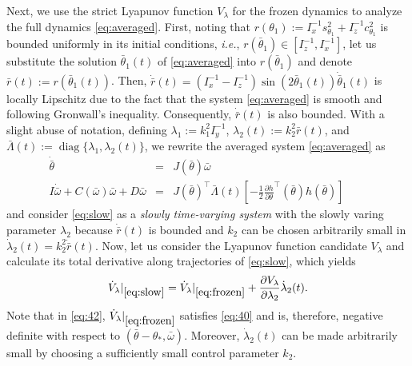 \documentclass{ifacconf}
\begin{document}
Next, we use the strict Lyapunov function $V_\lambda$ for the frozen dynamics to analyze the full dynamics \eqref{eq:averaged}. First, noting that $r(\theta_1):=I_x^{-1}s_{\theta_1}^2+I_z^{-1}c_{\theta_1}^2$ is bounded uniformly in its initial conditions, \textit{i.e.}, $r(\bar{\theta}_1)\in[I_z^{-1}, I_x^{-1}]$, let us substitute the solution $\bar{\theta}_1(t)$ of \eqref{eq:averaged} into $r(\bar{\theta}_1)$ and denote $\bar{r}(t):=r(\bar{\theta}_1(t))$. Then, $\dot{\bar{r}}(t)=(I_x^{-1}-I_z^{-1})\sin(2\bar{\theta}_1(t))\dot{\bar{\theta}}_1(t)$ is locally Lipschitz due to the fact that the system \eqref{eq:averaged} is smooth and following Gronwall's inequality. Consequently, $\dot{\bar{r}}(t)$ is also bounded. With a slight abuse of notation, defining $\lambda_1:=k_1^2 I_y^{-1}$, $\lambda_2(t):=k_2^2\bar{r}(t)$, and $\bar{\Lambda}(t):=\operatorname{diag}\{\lambda_1,\lambda_2(t)\}$, we rewrite the averaged system \eqref{eq:averaged} as
\begin{subequations}
  \label{eq:slow}
  \begin{eqnarray}
       \dot{\bar{\theta}} &=&J(\bar{\theta})\bar{\omega}  \label{eq:slow-a}\\
       I\dot{\bar{\omega}}+C(\bar{\omega})\bar{\omega} + D\bar{\omega}&=& J(\bar{\theta})^\top \bar{\Lambda}(t)\left[-\frac{1}{2}\frac{\partial h}{\partial \theta}^\top(\bar{\theta}) h(\bar{\theta})\right] \quad\quad\label{eq:slow-b}
  \end{eqnarray}
\end{subequations}
and consider \eqref{eq:slow} as a \textit{slowly time-varying system} with the slowly varing parameter $\lambda_2$ because $\dot{\bar{r}}(t)$ is bounded and $k_2$ can be chosen arbitrarily small in $\dot{\lambda}_2(t)=k_2^2\dot{\bar{r}}(t)$. Now, let us consider the Lyapunov function candidate $V_\lambda$ and calculate its total derivative along trajectories of \eqref{eq:slow}, which yields
\begin{equation}\label{eq:42}
    {\dot{V}_\lambda}|_{\eqref{eq:slow}}= {\dot{V}_\lambda}|_{\eqref{eq:frozen}} + \frac{\partial V_\lambda}{\partial \lambda_2}\dot{\lambda}_2(t).
\end{equation}
Note that in \eqref{eq:42}, \({\dot{V}_\lambda}|_{\eqref{eq:frozen}}\) satisfies \eqref{eq:40} and is, therefore, negative definite with respect to \((\bar{\theta} - \theta_*, \bar{\omega})\). Moreover, \(\dot{\lambda}_2(t)\) can be made arbitrarily small by choosing a sufficiently small control parameter \(k_2\).
\end{document}
